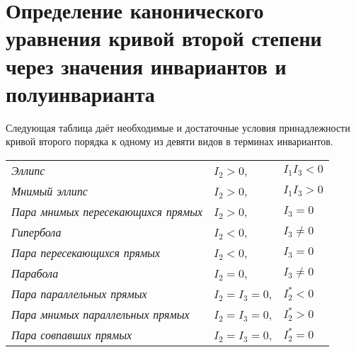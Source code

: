 \section{Определение канонического уравнения кривой второй степени через значения инвариантов и полуинварианта}

\begin{theorem}
    Следующая таблица даёт необходимые и достаточные условия принадлежности кривой второго порядка к одному из девяти видов в терминах инвариантов.

    \begin{center}
        \begin{tabular}{| l | l l |}
            \hline
            \textit{Эллипс} & $I_2 > 0$, & $I_1I_3 < 0$\\
            \textit{Мнимый эллипс} & $I_2 > 0$, & $I_1I_3 > 0$\\
            \textit{Пара мнимых пересекающихся прямых} & $I_2 > 0$, & $I_3 = 0$\\
            \textit{Гипербола} & $I_2 < 0$, & $I_3 \ne 0$\\
            \textit{Пара пересекающихся прямых} & $I_2 < 0$, & $I_3 = 0$\\
            \textit{Парабола} & $I_2 = 0$, & $I_3 \ne 0$\\
            \textit{Пара параллельных прямых} & $I_2 = I_3 = 0$, & $I_2^\ast < 0$\\
            \textit{Пара мнимых параллельных прямых} & $I_2 = I_3 = 0$, & $I_2^\ast > 0$\\
            \textit{Пара совпавших прямых} & $I_2 = I_3 = 0$, & $I_2^\ast = 0$\\
            \hline
        \end{tabular}
    \end{center}
\end{theorem}

